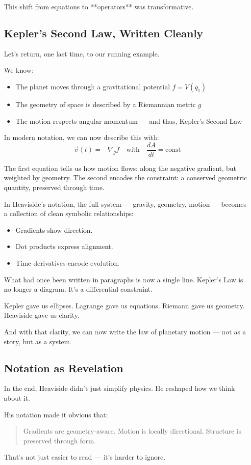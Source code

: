 This shift from equations to **operators** was transformative.

\subsection{Kepler’s Second Law, Written Cleanly}

Let’s return, one last time, to our running example.

We know:
\begin{itemize}
  \item The planet moves through a gravitational potential \( f = V(q_1) \)
  \item The geometry of space is described by a Riemannian metric \( g \)
  \item The motion respects angular momentum — and thus, Kepler’s Second Law
\end{itemize}

In modern notation, we can now describe this with:
\[
\vec{v}(t) = -\nabla_g f
\quad \text{with} \quad
\frac{dA}{dt} = \text{const}
\]

The first equation tells us how motion flows: along the negative gradient, but weighted by geometry.  
The second encodes the constraint: a conserved geometric quantity, preserved through time.

In Heaviside’s notation, the full system — gravity, geometry, motion — becomes a collection of clean symbolic relationships:
\begin{itemize}
    \item Gradients show direction.
    \item Dot products express alignment.
    \item Time derivatives encode evolution.
\end{itemize}

What had once been written in paragraphs is now a single line.  
Kepler’s Law is no longer a diagram. It’s a differential constraint.

\begin{tcolorbox}[colback=blue!5!white, colframe=blue!50!black, title={Heaviside’s Gift to Kepler}]
Kepler gave us ellipses.  
Lagrange gave us equations.  
Riemann gave us geometry.  
Heaviside gave us clarity.

And with that clarity, we can now write the law of planetary motion —  
not as a story, but as a system.
\end{tcolorbox}

\subsection{Notation as Revelation}

In the end, Heaviside didn’t just simplify physics.  
He reshaped how we think about it.

His notation made it obvious that:
\begin{quote}
    Gradients are geometry-aware.  
    Motion is locally directional.  
    Structure is preserved through form.
\end{quote}

That’s not just easier to read — it’s harder to ignore.

